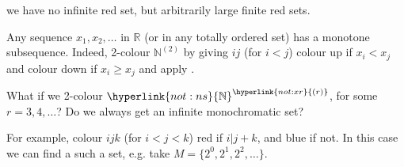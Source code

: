 \documentclass{article}
\newcommand{\red}[1]{\textcolor{bred}{#1}}
\newcommand{\blue}[1]{\textcolor{bblue}{#1}}
\begin{document}
\begin{remark}
\begin{enumerate}[(i)]
  we have no infinite red set, but arbitrarily large finite red sets.
  \end{enumerate}
\end{remark}
\begin{eg}
  Any sequence $x_1, x_2, \dotsc$ in $\mathbb{R}$ (or in any totally ordered set) has a monotone subsequence.
  Indeed, 2-colour $\mathbb{N}^{(2)}$ by giving $ij$ (for $i<j$) colour \red{up} if $x_i < x_j$ and colour \blue{down} if $x_i \geq x_j$ and apply .
\end{eg}
\newlec
What if we 2-colour $\hyperlink{not:ns}{\mathbb{N}}^{\hyperlink{not:xr}{(r)}}$, for some $r=3, 4, \dotsc$? Do we always get an infinite monochromatic set?
\begin{center}
\end{center}
For example, colour $ijk$ (for $i < j < k$) \red{red} if $i | j +k$, and \blue{blue} if not.
In this case we can find a such a set, e.g. take $M = \{2^0, 2^1, 2^2, \dotsc\}$.
\end{document}
